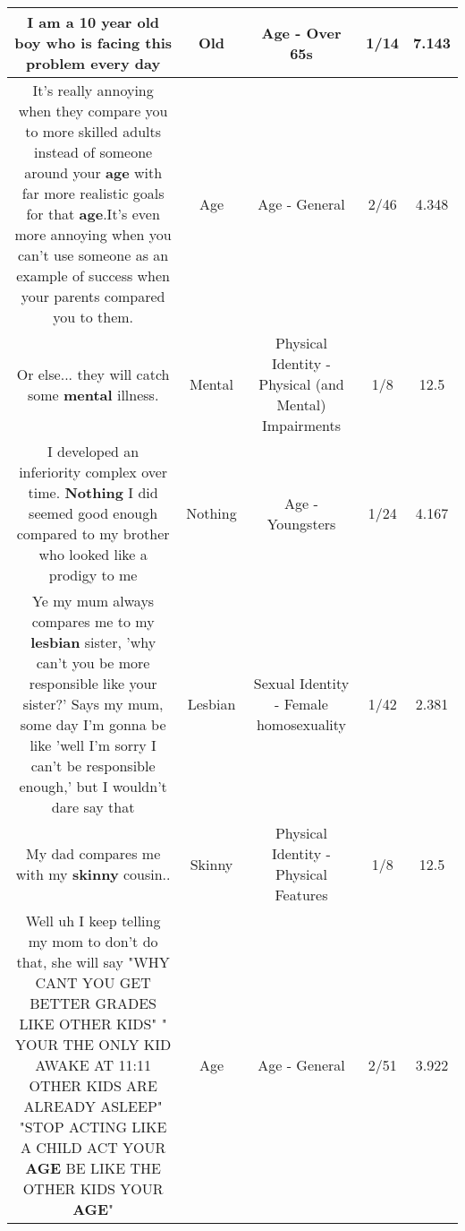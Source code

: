 \documentclass[11pt]{article}
\newlength\mylength
\begin{document}
\begin{center}
\begin{longtable}{|C{.65\mylength}|C{.30\mylength}|C{.12\mylength}|C{.12\mylength}|C{.12\mylength}|}
  \small I am a 10 year \textbf{old} boy who is facing this problem every day\normalsize   & Old & Age - Over 65s & 1/14 & 7.143 \\  \hline
  \small It's really annoying when they compare you to more skilled adults instead of someone around your \textbf{age} with far more realistic goals for that \textbf{age}.It's even more annoying when you can't use someone as an example of success when your parents compared you to them.\normalsize   & Age & Age - General & 2/46 & 4.348 \\  \hline
  \small Or else... they will catch some \textbf{mental} illness.\normalsize   & Mental & Physical Identity - Physical (and Mental) Impairments & 1/8 & 12.5 \\  \hline
  \small I developed an inferiority complex over time. \textbf{Nothing} I did seemed good enough compared to my brother who looked like a prodigy to me\normalsize   & Nothing & Age - Youngsters & 1/24 & 4.167 \\  \hline
  \small Ye my mum always compares me to my \textbf{lesbian} sister, 'why can't you be more responsible like your sister?' Says my mum, some day I'm gonna be like 'well I'm sorry I can't be responsible enough,' but I wouldn't dare say that\normalsize   & Lesbian & Sexual Identity - Female homosexuality & 1/42 & 2.381 \\  \hline
  \small My dad compares me with my \textbf{skinny} cousin..\normalsize   & Skinny & Physical Identity - Physical Features & 1/8 & 12.5 \\  \hline
  \small Well uh I keep telling my mom to don't do that, she will say "WHY CANT YOU GET BETTER GRADES LIKE OTHER KIDS" " YOUR THE ONLY KID AWAKE AT 11:11 OTHER KIDS ARE ALREADY ASLEEP" "STOP ACTING LIKE A CHILD ACT YOUR \textbf{AGE} BE LIKE THE OTHER KIDS YOUR \textbf{AGE}"\normalsize   & Age & Age - General & 2/51 & 3.922 \\  \hline

\end{longtable}
\end{center}
\end{document}
